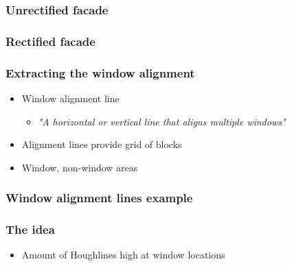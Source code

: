 \documentclass{beamer}
\begin{document}
\frame
{
	\frametitle{Unrectified facade}
}

\frame
{
	\frametitle{Rectified facade}
}


\frame
{
}

\frame
{
}


\frame
{
	\frametitle{Extracting the window alignment}
	\begin{itemize}
	\item Window alignment line
	\begin{itemize}
		\item <+-| alert@+> \emph{"A horizontal or vertical line that aligns multiple windows"}
	\end{itemize}
	\item <+-| alert@+> Alignment lines provide grid of blocks
	\item <+-| alert@+> Window, non-window areas
	\end{itemize}
	
}


\frame
{
	\frametitle{Window alignment lines example}
}

\frame
{
	\frametitle{The idea}
	\begin{itemize}
	\item <+-| alert@+> Amount of Houghlines high at window locations
	\end{itemize}
}
\end{document}
